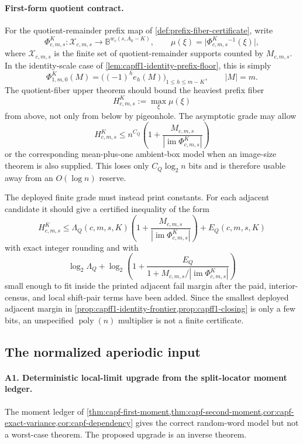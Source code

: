 \documentclass[11pt]{article}
\theoremstyle{definition}
\theoremstyle{remark}
\newcommand{\B}{\mathbb{B}}
\begin{document}
\paragraph{First-form quotient contract.}
For the quotient-remainder prefix map of \cref{def:prefix-fiber-certificate}, write
\[
        \Phi_{c,m,s}^{K}:\mathcal X_{c,m,s}\longrightarrow \B^{w_c(s,A_0-K)},
        \qquad
        \mu(\xi)=\bigl|\Phi_{c,m,s}^{K}{}^{-1}(\xi)\bigr|,
\]
where $\mathcal X_{c,m,s}$ is the finite set of quotient-remainder supports counted by $M_{c,m,s}$.  In the identity-scale case of \cref{lem:capff1-identity-prefix-floor}, this is simply
\[
        \Phi_{1,m,0}^{K}(M)=\bigl((-1)^he_h(M)\bigr)_{1\le h\le m-K},
        \qquad |M|=m .
\]
The quotient-fiber upper theorem should bound the heaviest prefix fiber
\[
        H_{c,m,s}^{K}:=\max_{\xi}\mu(\xi)
\]
from above, not only from below by pigeonhole.  The asymptotic grade may allow
\[
        H_{c,m,s}^{K}
        \le n^{C_Q}\left(1+\frac{M_{c,m,s}}{|\operatorname{im}\Phi_{c,m,s}^{K}|}\right)
\]
or the corresponding mean-plus-one ambient-box model when an image-size theorem is also supplied.  This loses only $C_Q\log_2 n$ bits and is therefore usable away from an $O(\log n)$ reserve.

The deployed finite grade must instead print constants.  For each adjacent candidate it should give a certified inequality of the form
\[
        H_{c,m,s}^{K}
        \le
        \Lambda_Q(c,m,s,K)\left(1+\frac{M_{c,m,s}}{|\operatorname{im}\Phi_{c,m,s}^{K}|}\right)+E_Q(c,m,s,K)
\]
with exact integer rounding and with
\[
        \log_2\Lambda_Q+
        \log_2\left(1+\frac{E_Q}{1+M_{c,m,s}/|\operatorname{im}\Phi_{c,m,s}^{K}|}\right)
\]
small enough to fit inside the printed adjacent fail margin after the paid, interior-census, and local shift-pair terms have been added.  Since the smallest deployed adjacent margin in \cref{prop:capff1-identity-frontier,prop:capff1-closing} is only a few bits, an unspecified $\operatorname{poly}(n)$ multiplier is not a finite certificate.

\subsection{The normalized aperiodic input}\label{subsec:capfaq-A-strategies}

\paragraph{A1. Deterministic local-limit upgrade from the split-locator moment ledger.}
The moment ledger of \cref{thm:capf-first-moment,thm:capf-second-moment,cor:capf-exact-variance,cor:capf-dependency} gives the correct random-word model but not a worst-case theorem.  The proposed upgrade is an inverse theorem.
\end{document}
